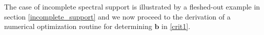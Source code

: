 \documentclass[a4paper]{article}
\begin{document}
The case of incomplete spectral support is illustrated by a fleshed-out example in section \ref{incomplete_support} and we now proceed to the derivation of a numerical optimization routine for determining $\mathbf{b}$ in \ref{crit1}.



\end{document}
